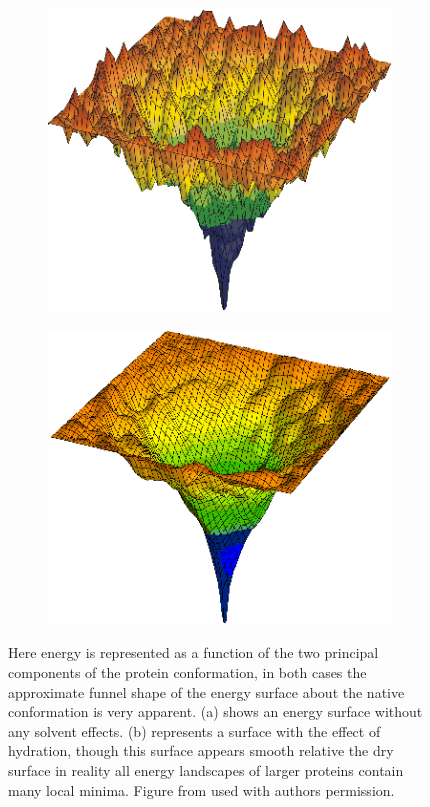 \begin{figure}[h]
\centering
\begin{subfigure}[b]{0.3\textwidth}
    \centering
    \includegraphics[width=\textwidth]{figures/drysurf.png}
    \label{fig:dry}
    \caption{}
\end{subfigure}%
\hspace{0.1\textwidth}
\begin{subfigure}[b]{0.3\textwidth}
    \centering
    \includegraphics[width=\textwidth]{figures/wetsurf.png}
    \label{fig:wet}
    \caption{}
\end{subfigure}
\caption{
Here energy is represented as a function of the two principal components of the protein conformation, in both cases the approximate funnel shape of the energy surface about the native conformation is very apparent.
(a) shows an energy surface without any solvent effects.
(b) represents a surface with the effect of hydration, though this surface appears smooth relative the dry surface in reality all energy landscapes of larger proteins contain many local minima.
Figure from \protect\cite{waterwebsite} used with authors permission.
}
\label{fig:funnel}
\end{figure}
